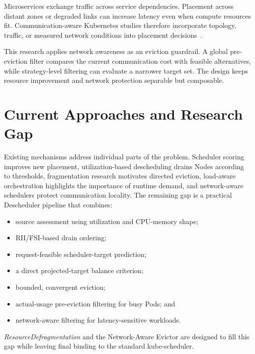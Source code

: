 Microservices exchange traffic across service dependencies. Placement across distant zones or degraded links can increase latency even when compute resources fit. Communication-aware Kubernetes studies therefore incorporate topology, traffic, or measured network conditions into placement decisions~\citep{marchese2022network,marchese_tomarchio_2022,chen2024trade,pusztai_pogonip_2021}.

This research applies network awareness as an eviction guardrail. A global pre-eviction filter compares the current communication cost with feasible alternatives, while strategy-level filtering can evaluate a narrower target set. The design keeps resource improvement and network protection separable but composable.

\section{Current Approaches and Research Gap}
\label{sec:researchGap}

Existing mechanisms address individual parts of the problem. Scheduler scoring improves new placement, utilization-based descheduling drains Nodes according to thresholds, fragmentation research motivates directed eviction, load-aware orchestration highlights the importance of runtime demand, and network-aware schedulers protect communication locality. The remaining gap is a practical Descheduler pipeline that combines:

\begin{itemize}
    \item source assessment using utilization and CPU-memory shape;
    \item RII/FSI-based drain ordering;
    \item request-feasible scheduler-target prediction;
    \item a direct projected-target balance criterion;
    \item bounded, convergent eviction;
    \item actual-usage pre-eviction filtering for busy Pods; and
    \item network-aware filtering for latency-sensitive workloads.
\end{itemize}

\textit{ResourceDefragmentation} and the Network-Aware Evictor are designed to fill this gap while leaving final binding to the standard kube-scheduler.

